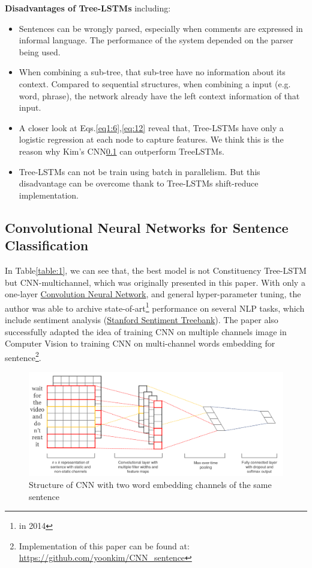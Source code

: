 \textbf{Disadvantages of Tree-LSTMs} including:\label{treelstm-drawback}
\begin{itemize}
\item Sentences can be wrongly parsed, especially when comments are expressed in informal language.
The performance of the system depended on the parser being used.
\item When combining a sub-tree, that sub-tree have no information about its context. 
Compared to sequential structures, when combining a input (e.g. word, phrase), the network already have the left context information of that input\cite{shift-reduce}.
\item A closer look at Eqs.\eqref{eq1:6},\eqref{eq:12} reveal that, Tree-LSTMs have only a logistic regression at each node to capture features.
We think this is the reason why Kim's CNN\ref{kim-cnn} can outperform TreeLSTMs.  
\item Tree-LSTMs can not be train using batch in parallelism. But this disadvantage can be overcome thank to Tree-LSTMs shift-reduce implementation\cite{shift-reduce}.
\end{itemize}


\subsection{Convolutional Neural Networks for Sentence Classification}\label{kim-cnn}
In Table\ref{table:1}, we can see that, the best model is not Constituency Tree-LSTM but CNN-multichannel\cite{KimCNN}, which was originally presented in this paper. 
With only a one-layer \hyperref[sec:cnn]{Convolution Neural Network}, and general hyper-parameter tuning, the author was able to archive state-of-art\footnote{in 2014} performance on several NLP tasks, which include sentiment analysis (\hyperref[sec:sst]{Stanford Sentiment Treebank}\cite{socher2013recursive}). 
The paper also successfully adapted the idea of training CNN on multiple channels image in Computer Vision to training CNN on multi-channel words embedding for sentence\footnote{Implementation of this paper can be found at: \url{https://github.com/yoonkim/CNN\_sentence}}.

\begin{figure}[H]
	\centering
	\includegraphics[scale=0.33]{figure/sentencecnn}
	\caption{Structure of CNN with two word embedding channels of the same sentence}
	\label{fig:multi-cnn}
\end{figure}

